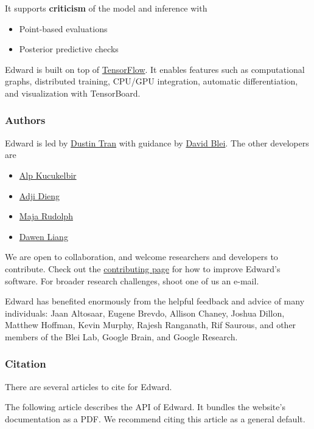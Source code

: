 It supports \textbf{criticism} of the model and inference with

\begin{itemize}
\item Point-based evaluations
\item Posterior predictive checks
\end{itemize}

Edward is built on top of
\href{https://www.tensorflow.org}{TensorFlow}. It enables features such
as computational graphs, distributed training, CPU/GPU integration,
automatic differentiation, and visualization with TensorBoard.

\subsubsection{Authors}

Edward is led by \href{http://dustintran.com}{Dustin Tran} with guidance
by \href{http://www.cs.columbia.edu/~blei/}{David Blei}. The other developers
are
\begin{itemize}
  \item \href{http://www.proditus.com/}{Alp Kucukelbir}
  \item \href{http://stat.columbia.edu/~diengadji/}{Adji Dieng}
  \item \href{http://maja-rita-rudolph.com/}{Maja Rudolph}
  \item \href{http://www.ee.columbia.edu/~dliang/}{Dawen Liang}
\end{itemize}
We are open to collaboration, and welcome
researchers and developers to contribute. Check out the
\href{/contributing}{contributing page} for how to improve Edward's software.
For broader research challenges, shoot one of us an e-mail.

Edward has benefited enormously from the helpful feedback and advice
of many individuals: Jaan Altosaar, Eugene Brevdo, Allison Chaney,
Joshua Dillon, Matthew Hoffman, Kevin Murphy, Rajesh Ranganath, Rif
Saurous, and other members of the Blei Lab, Google Brain, and Google
Research.

\subsubsection{Citation}

There are several articles to cite for Edward.

The following article describes the API of Edward. It bundles the
website's documentation as a PDF.
We recommend citing this article as a general default.

